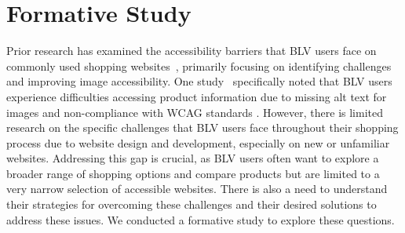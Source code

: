 \section{Formative Study}
\label{sec:phase1}
\label{sec:formative study}
Prior research has examined the accessibility barriers that BLV users face on commonly used shopping websites~\cite{10.1145/3313831.3376404, 10.1145/3411764.3445547}, primarily focusing on identifying challenges and improving image accessibility. One study~\cite{10.1145/3234695.3236337} specifically noted that BLV users experience difficulties accessing product information due to missing alt text for images and non-compliance with WCAG standards \cite{wcag21}. However, there is limited research on the specific challenges that BLV users face throughout their shopping process due to website design and development, especially on new or unfamiliar websites. Addressing this gap is crucial, as BLV users often want to explore a broader range of shopping options and compare products but are limited to a very narrow selection of accessible websites. There is also a need to understand their strategies for overcoming these challenges and their desired solutions to address these issues. We conducted a formative study to explore these questions.





